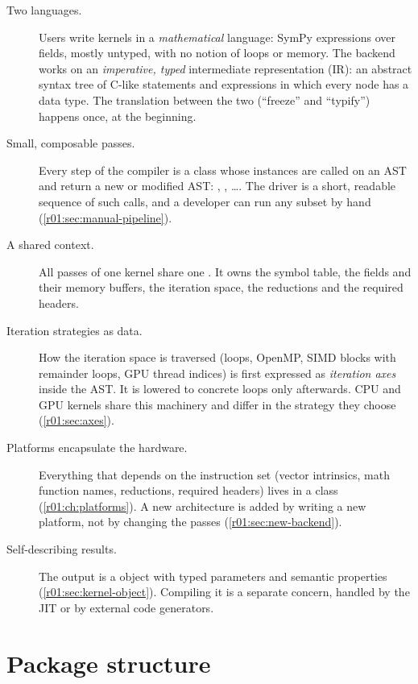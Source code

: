 \begin{description}
  \item[Two languages.] Users write kernels in a \emph{mathematical} language: SymPy
        expressions over fields, mostly untyped, with no notion of loops or memory. The
        backend works on an \emph{imperative, typed} intermediate representation (IR): an
        abstract syntax tree of C-like statements and expressions in which every node has
        a data type. The translation between the two (``freeze'' and ``typify'')
        happens once, at the beginning.
  \item[Small, composable passes.] Every step of the compiler is a class whose
        instances are called on an AST and return a new or modified AST:
        , , \dots. The
        driver is a short, readable sequence of such calls, and a developer can run any
        subset by hand (\cref{r01:sec:manual-pipeline}).
  \item[A shared context.] All passes of one kernel share one
        . It owns the symbol table, the fields and their
        memory buffers, the iteration space, the reductions and the required headers.
  \item[Iteration strategies as data.] How the iteration space is traversed (loops,
        OpenMP, SIMD blocks with remainder loops, GPU thread indices) is first expressed
        as \emph{iteration axes} inside the AST. It is lowered to concrete loops only
        afterwards. CPU and GPU kernels share this machinery and differ in the
        strategy they choose (\cref{r01:sec:axes}).
  \item[Platforms encapsulate the hardware.] Everything that depends on the instruction
        set (vector intrinsics, math function names, reductions, required headers) lives
        in a  class (\cref{r01:ch:platforms}). A new architecture is added by
        writing a new platform, not by changing the passes (\cref{r01:sec:new-backend}).
  \item[Self-describing results.] The output is a  object with typed
        parameters and semantic properties (\cref{r01:sec:kernel-object}). Compiling it is
        a separate concern, handled by the JIT or by external code generators.
\end{description}

\section{Package structure}

